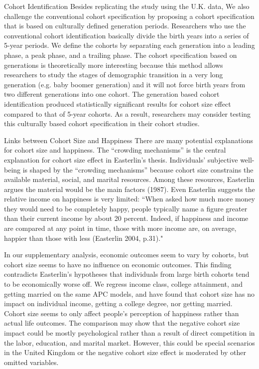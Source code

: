 Cohort Identification
Besides replicating the study using the U.K. data, We also challenge the conventional cohort specification by proposing a cohort specification that is based on culturally defined generation periods. Researchers who use the conventional cohort identification basically divide the birth years into a series of 5-year periods. We define the cohorts by separating each generation into a leading phase, a peak phase, and a trailing phase. The cohort specification based on generations is theoretically more interesting because this method allows researchers to study the stages of demographic transition in a very long generation (e.g. baby boomer generation) and it will not force birth years from two different generations into one cohort. The generation based cohort identification produced statistically significant results for cohort size effect compared to that of 5-year cohorts. As a result, researchers may consider testing this culturally based cohort specification in their cohort studies.

Links between Cohort Size and Happiness
There are many potential explanations for cohort size and happiness. The “crowding mechanisms” is the central explanation for cohort size effect in Easterlin’s thesis. Individuals’ subjective well-being is shaped by the “crowding mechanisms” because cohort size constrains the available material, social, and marital resources. Among these resources, Easterlin argues the material would be the main factors (1987). Even Easterlin suggests the relative income on happiness is very limited: “When asked how much more money they would need to be completely happy, people typically name a figure greater than their current income by about 20 percent. Indeed, if happiness and income are compared at any point in time, those with more income are, on average, happier than those with less (Easterlin 2004, p.31)." 

In our supplementary analysis, economic outcomes seem to vary by cohorts, but cohort size seems to have no influence on economic outcomes. This finding contradicts Easterlin's hypotheses that individuals from large birth cohorts tend to be economically worse off. We regress income class, college attainment, and getting married on the same APC models, and have found that cohort size has no impact on individual income, getting a college degree, nor getting married. Cohort size seems to only affect people’s perception of happiness rather than actual life outcomes. The comparison may show that the negative cohort size impact could be mostly psychological rather than a result of direct competition in the labor, education, and marital market. However, this could be special scenarios in the United Kingdom or the negative cohort size effect is moderated by other omitted variables.

